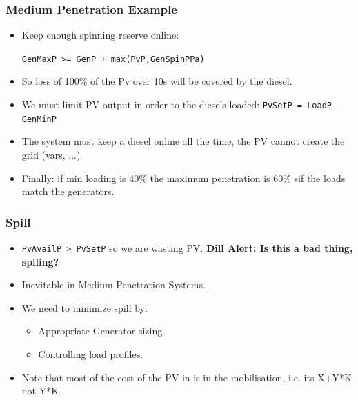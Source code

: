 \documentclass{beamer}
\def\dill#1{\textcolor{RawSienna}{\textbf{Dill Alert: #1}}}
\begin{document}
\begin{frame}\frametitle{Medium Penetration Example}
  \begin{itemize}
  \item Keep enough spinning reserve online: 

    \texttt{GenMaxP >= GenP + max(PvP,GenSpinPPa)}
   \pause
  \item So loss of 100\% of the Pv over 10s will be covered by the
    diesel.
    \pause
  \item We must limit PV output in order to the diesels loaded:
    \texttt{PvSetP = LoadP - GenMinP}
    \pause
  \item The system must keep a diesel online all the time,
    the PV cannot create the grid (vars, ...)
    \pause
  \item Finally: if min loading is 40\% the maximum penetration
    is 60\% sif the loads match the generators.
  \end{itemize}
\end{frame}

\begin{frame}\frametitle{Spill}
  \begin{itemize}
  \item \texttt{PvAvailP > PvSetP} so we are wasting PV.
    \pause
    \dill{Is this a bad thing, splling?}
    \pause
  \item Inevitable in Medium Penetration Systems.
    \pause
  \item We need to minimize spill by:
    \pause
    \begin{itemize}
    \item Appropriate Generator sizing.
    \item Controlling load profiles.
    \end{itemize}
  \item Note that most of the cost of the PV in is
    in the mobilisation, i.e. its X+Y*K not Y*K.
  \end{itemize}
\end{frame}
\end{document}
